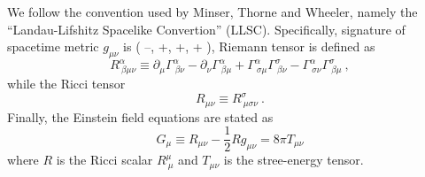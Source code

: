 We follow the convention used by Minser, Thorne and Wheeler\cite{Misner:1974qy}, namely the ``Landau-Lifshitz Spacelike Convertion'' (LLSC). Specifically, signature of spacetime metric $g_{\mu\nu}$ is ( --, +, +, + ), Riemann tensor is defined as 
\begin{equation}
	R^{\alpha}_{~\beta \mu \nu} \equiv 
	\partial_{\mu}\Gamma^{\alpha}_{~\beta \nu} - 
	\partial_{\nu}\Gamma^{\alpha}_{~\beta \mu} + \Gamma^{\alpha}_{~\sigma \mu}\Gamma^{\sigma}_{~\beta \nu} - \Gamma^{\alpha}_{~\sigma \nu}\Gamma^{\sigma}_{~\beta\mu} \ , 
\end{equation}
while the Ricci tensor 
\begin{equation}
	R_{\mu\nu} \equiv R^{\sigma}_{~\mu\sigma\nu} \ . 
\end{equation}
Finally, the Einstein field equations are stated as 
\begin{equation}
	G_{\mu} \equiv R_{\mu\nu} - \frac{1}{2} R g_{\mu\nu} = 8\pi T_{\mu\nu} 
\end{equation}
where $R$ is the Ricci scalar $R^{\mu}_{~\mu}$ and $T_{\mu\nu}$ is the stree-energy tensor. 

